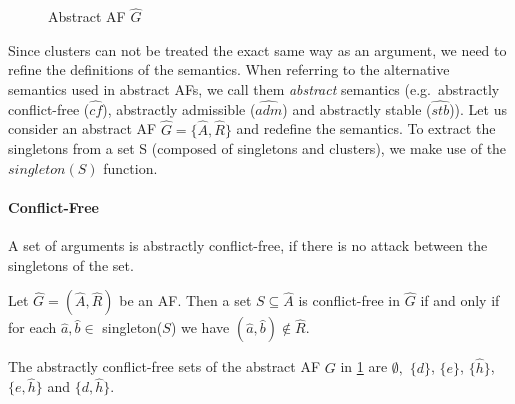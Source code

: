 \begin{figure}[h]
    \centering
    \caption{Abstract AF $\hat{G}$}
    \label{af:backgroundExampleClusterSpurious}
\end{figure}


Since clusters can not be treated the exact same way as an argument, we need to refine the definitions of the semantics. When referring to the alternative semantics used in abstract AFs, we call them \emph{abstract} semantics (e.g.\ abstractly conflict-free ($\hat{cf}$), abstractly admissible ($\hat{adm}$) and abstractly stable ($\hat{stb}$)). Let us consider an abstract AF $\hat{G}=\{\hat{A}, \hat{R}\}$ and redefine the semantics. To extract the singletons from a set S (composed of singletons and clusters), we make use of the $singleton(S)$ function.

\paragraph{Conflict-Free} A set of arguments is abstractly conflict-free, if there is no attack between the singletons of the set.

\begin{definition}
    Let $\hat{G}=(\hat{A},\hat{R})$ be an AF. Then a set  $S \subseteq \hat{A}$ is conflict-free in $\hat{G}$ if and only if for each $\hat{a}, \hat{b} \in$ singleton($S$) we have $(\hat{a}, \hat{b}) \not\in \hat{R}$.
\end{definition}

\begin{example}
    The abstractly conflict-free sets of the abstract AF $G$ in \cref{af:backgroundExampleClusterSpurious} are 
    $\emptyset,$
    $\{d\}$,
    $\{e\}$,
    $\{\hat{h}\}$,
    $\{e, \hat{h}\}$ and
    $\{d, \hat{h}\}$.
\end{example}




